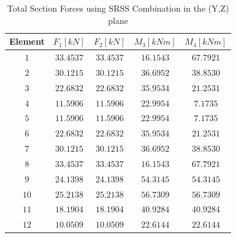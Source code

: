 \documentclass[11pt,a4paper,titlepage]{report}
\begin{document}
\begin{table}[h]
    \centering
    \begin{tabular}{c|c|c|c|c}
    Element & $F_1 [kN]$ & $F_2 [kN]$ & $M_3 [kNm]$ & $M_4 [kNm]$ \\
    \hline
       $1$ & $33.4537$ & $33.4537$ & $16.1543$ & $67.7921$ \\
       $2$ & $30.1215$ & $30.1215$ & $36.6952$ & $38.8530$ \\
       $3$ & $22.6832$ & $22.6832$ & $35.9534$ & $21.2531$ \\
       $4$ & $11.5906$ & $11.5906$ & $22.9954$ & $7.1735$ \\
       $5$ & $11.5906$ & $11.5906$ & $22.9954$ & $7.1735$ \\
       $6$ & $22.6832$ & $22.6832$ & $35.9534$ & $21.2531$ \\
       $7$ & $30.1215$ & $30.1215$ & $36.6952$ & $38.8530$ \\
       $8$ & $33.4537$ & $33.4537$ & $16.1543$ & $67.7921$ \\
       $9$ & $24.1398$ & $24.1398$ & $54.3145$ & $54.3145$ \\
       $10$ & $25.2138$ & $25.2138$ & $56.7309$ & $56.7309$ \\
       $11$ & $18.1904$ & $18.1904$ & $40.9284$ & $40.9284$ \\
       $12$ & $10.0509$ & $10.0509$ & $22.6144$ & $22.6144$ \\
    \end{tabular}
    \caption{Total Section Forces using SRSS Combination in the (Y,Z) plane}
    \label{tab:totl section forces SRSS Y}
\end{table}
\end{document}
